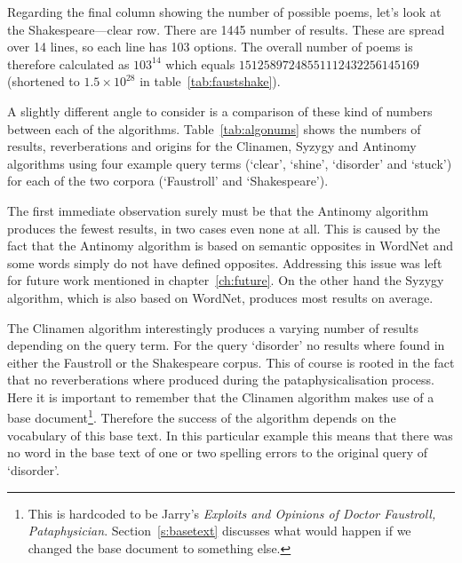 Regarding the final column showing the number of possible poems, let's look at the Shakespeare---clear row. There are 1445 number of results. These are spread over 14 lines, so each line has 103 options. The overall number of poems is therefore calculated as $103^{14}$ which equals $15125897248551112432256145169$ (shortened to $1.5 \times 10^{28}$ in table~\ref{tab:faustshake}).

\spirals

A slightly different angle to consider is a comparison of these kind of numbers between each of the algorithms. Table~\ref{tab:algonums} shows the numbers of results, reverberations and origins for the Clinamen, Syzygy and Antinomy algorithms using four example query terms (`clear', `shine', `disorder' and `stuck') for each of the two corpora (`Faustroll' and `Shakespeare').

The first immediate observation surely must be that the Antinomy algorithm produces the fewest results, in two cases even none at all. This is caused by the fact that the Antinomy algorithm is based on semantic opposites in WordNet and some words simply do not have defined opposites. Addressing this issue was left for future work mentioned in chapter~\ref{ch:future}. On the other hand the Syzygy algorithm, which is also based on WordNet, produces most results on average.

The Clinamen algorithm interestingly produces a varying number of results depending on the query term. For the query `disorder' no results where found in either the Faustroll or the Shakespeare corpus. This of course is rooted in the fact that no reverberations where produced during the pataphysicalisation process. Here it is important to remember that the Clinamen algorithm makes use of a base document\footnote{This is hardcoded to be Jarry's \textit{Exploits and Opinions of Doctor Faustroll, Pataphysician}. Section~\ref{s:basetext} discusses what would happen if we changed the base document to something else.}. Therefore the success of the algorithm depends on the vocabulary of this base text. In this particular example this means that there was no word in the base text of one or two spelling errors to the original query of `disorder'.

